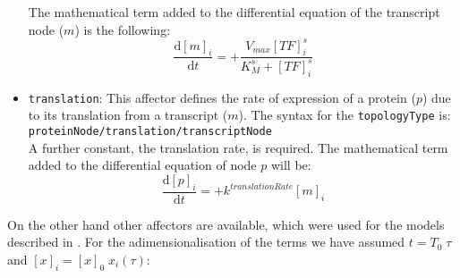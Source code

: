 \documentclass[a4paper, 11pt]{article}
\begin{document}
\begin{itemize}
  The mathematical term added to the differential equation of the transcript node ($m$) is the following:
  \begin{equation}
    \frac{\mathrm{d}[m]_i}{\mathrm{d}t} = +\frac{V_{max}[TF]_i^s}{K_M^s + [TF]_i^s}
  \end{equation}
\item \texttt{translation}: 
  This affector defines the rate of expression of a protein ($p$) due to its translation from a transcript ($m$).
  The syntax for the \texttt{topologyType} is:\\[1.5ex]
  \texttt{proteinNode/translation/transcriptNode}\\[1.5ex]
  A further constant, the translation rate, is required.
  The mathematical term added to the differential equation of node $p$ will be:
  \begin{equation}
    \frac{\mathrm{d}[p]_i}{\mathrm{d}t} = + k^{translationRate}  [m]_i
  \end{equation}
\end{itemize}
On the other hand other affectors are available, which were used for the models described in \cite{garciadelomana08}.
For the adimensionalisation of the terms we have assumed $t=T_0\;\tau$ and $[x]_i=[x]_0\;x_i(\tau)$:
\end{document}
